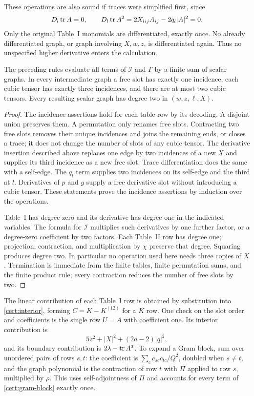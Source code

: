 These operations are also sound if traces were simplified first, since
\[
 D_l\operatorname{tr} A=0,\qquad
 D_l\operatorname{tr} A^2=2X_{lij}A_{ij}-2q_l|A|^2=0.
\]
Only the original Table~I monomials are differentiated, exactly once.  No
already differentiated graph, or graph involving $X,w,z$, is differentiated
again.  Thus no unspecified higher derivative enters the calculation.

\begin{lemma}\label{cert:closure}
The preceding rules evaluate all terms of $\mathcal I$ and $\Gamma$ by a
finite sum of scalar graphs.  In every intermediate graph a free slot has
exactly one incidence, each cubic tensor has exactly three incidences, and
there are at most two cubic tensors.  Every resulting scalar graph has
degree two in $(w,z,\ell,X)$.
\end{lemma}
\begin{proof}
The incidence assertions hold for each table row by its decoding.  A
disjoint union preserves them.  A permutation only renames free slots.
Contracting two free slots removes their unique incidences and joins the
remaining ends, or closes a trace; it does not change the number of slots of
any cubic tensor.  The derivative insertion described above replaces one
edge by two incidences of a new $X$ and supplies its third incidence as a
new free slot.  Trace differentiation does the same with a self-edge.
The $q_l$ term supplies two incidences on its self-edge and the third at $l$.
Derivatives of $p$ and $g$ supply a free derivative slot without introducing
a cubic tensor.  These statements prove the incidence assertions by
induction over the operations.

Table~I has degree zero and its derivative has degree one in the indicated
variables.  The formula for $\mathcal I$ multiplies such derivatives by one
further factor, or a degree-zero coefficient by two factors.  Each Table~II
row has degree one; projection, contraction, and multiplication by $\chi$
preserve that degree.  Squaring produces degree two.  In particular no
operation used here needs three copies of $X$.  Termination is immediate
from the finite tables, finite permutation sums, and the finite product
rule; every contraction reduces the number of free slots by two.
\end{proof}

The linear contribution of each Table~I row is obtained by substitution into
\eqref{cert:interior}, forming $C=K-K^{(12)}$ for a $K$ row.  One check on
the slot order and coefficients is the single row $U=A$ with coefficient
one.  Its interior contribution is
\[
 5z^2+|X|^2+(2a-2)|q|^2,
\]
and its boundary contribution is $2\lambda-\operatorname{tr} A^3$.
To expand a Gram block, sum over unordered pairs of rows $s,t$: the
coefficient is $\sum_c c_{sc}c_{tc}/Q^2$, doubled when $s\ne t$, and the
graph polynomial is the contraction of row $t$ with $\Pi$ applied to row
$s$, multiplied by $\rho$.  This uses self-adjointness of $\Pi$ and accounts
for every term of \eqref{cert:gram-block} exactly once.

